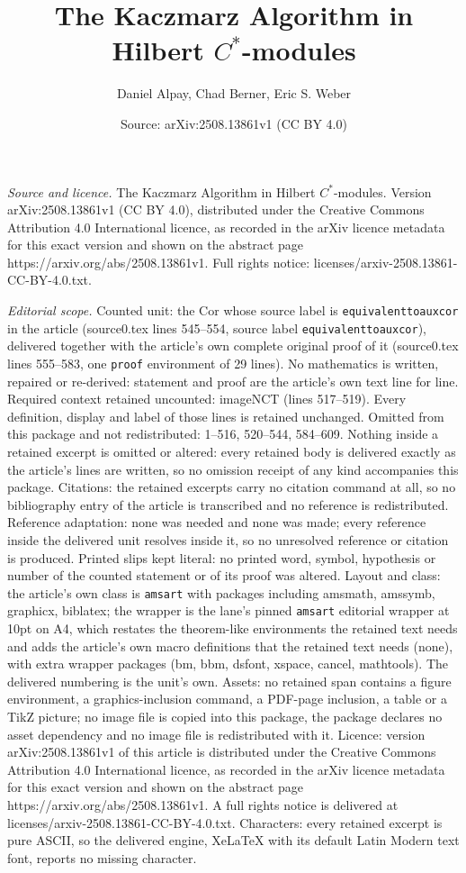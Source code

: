 \documentclass[10pt,a4paper]{amsart}
\title[The Kaczmarz Algorithm in Hilbert $C^{*}$-modules]{The Kaczmarz Algorithm in Hilbert $C^{*}$-modules}
\author{Daniel Alpay, Chad Berner, Eric S. Weber}
\date{Source: arXiv:2508.13861v1 (CC BY 4.0)}
\begin{document}
\maketitle

\noindent\emph{Source and licence.} The Kaczmarz Algorithm in Hilbert $C^{*}$-modules. Version arXiv:2508.13861v1 (CC BY 4.0), distributed under the Creative Commons Attribution 4.0 International licence, as recorded in the arXiv licence metadata for this exact version and shown on the abstract page https://arxiv.org/abs/2508.13861v1. Full rights notice: licenses/arxiv-2508.13861-CC-BY-4.0.txt.\par\smallskip

\noindent\textit{Editorial scope.} Counted unit: the Cor whose source label is \texttt{equivalenttoauxcor} in the article (source0.tex lines 545--554, source label \texttt{equivalenttoauxcor}), delivered together with the article's own complete original proof of it (source0.tex lines 555--583, one \texttt{proof} environment of 29 lines). No mathematics is written, repaired or re-derived: statement and proof are the article's own text line for line. Required context retained uncounted: imageNCT (lines 517--519). Every definition, display and label of those lines is retained unchanged. Omitted from this package and not redistributed: 1--516, 520--544, 584--609. Nothing inside a retained excerpt is omitted or altered: every retained body is delivered exactly as the article's lines are written, so no omission receipt of any kind accompanies this package. Citations: the retained excerpts carry no citation command at all, so no bibliography entry of the article is transcribed and no reference is redistributed. Reference adaptation: none was needed and none was made; every reference inside the delivered unit resolves inside it, so no unresolved reference or citation is produced. Printed slips kept literal: no printed word, symbol, hypothesis or number of the counted statement or of its proof was altered. Layout and class: the article's own class is \texttt{amsart} with packages including amsmath, amssymb, graphicx, biblatex; the wrapper is the lane's pinned \texttt{amsart} editorial wrapper at 10pt on A4, which restates the theorem-like environments the retained text needs and adds the article's own macro definitions that the retained text needs (none), with extra wrapper packages (bm, bbm, dsfont, xspace, cancel, mathtools). The delivered numbering is the unit's own. Assets: no retained span contains a figure environment, a graphics-inclusion command, a PDF-page inclusion, a table or a TikZ picture; no image file is copied into this package, the package declares no asset dependency and no image file is redistributed with it. Licence: version arXiv:2508.13861v1 of this article is distributed under the Creative Commons Attribution 4.0 International licence, as recorded in the arXiv licence metadata for this exact version and shown on the abstract page https://arxiv.org/abs/2508.13861v1. A full rights notice is delivered at licenses/arxiv-2508.13861-CC-BY-4.0.txt. Characters: every retained excerpt is pure ASCII, so the delivered engine, XeLaTeX with its default Latin Modern text font, reports no missing character.
\end{document}
